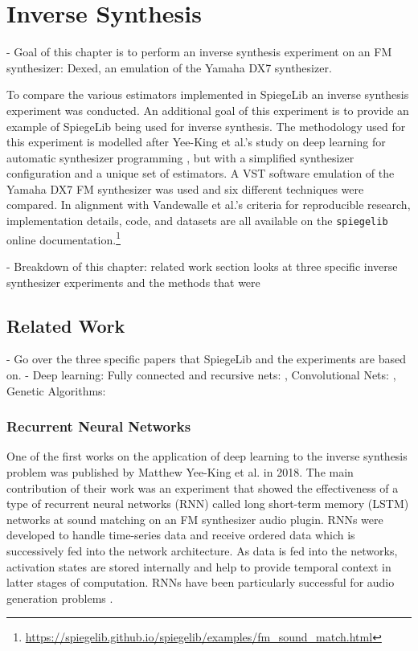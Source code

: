 \chapter{Inverse Synthesis}
\label{chapter:inverse_synth_experiment}

- Goal of this chapter is to perform an inverse synthesis experiment on an FM synthesizer: Dexed, an emulation of the Yamaha DX7 synthesizer. 

To compare the various estimators implemented in SpiegeLib an inverse synthesis experiment was conducted. An additional goal of this experiment is to provide an example of SpiegeLib being used for inverse synthesis. The methodology used for this experiment is modelled after Yee-King et al.'s study on deep learning for automatic synthesizer programming \cite{yee2018automatic}, but with a simplified synthesizer configuration and a unique set of estimators. A VST software emulation of the Yamaha DX7 FM synthesizer was used and six different techniques were compared. In alignment with Vandewalle et al.'s criteria for reproducible research, implementation details, code, and datasets are all available on the \texttt{spiegelib} online documentation.\footnote{\url{https://spiegelib.github.io/spiegelib/examples/fm_sound_match.html}}

- Breakdown of this chapter: related work section looks at three specific inverse synthesizer experiments and the methods that were 

\section{Related Work}
- Go over the three specific papers that SpiegeLib and the experiments are based on.
- Deep learning: Fully connected and recursive nets: \cite{yee2018automatic}, Convolutional Nets: \cite{barkan2019inversynth}, Genetic Algorithms: \cite{tatar2016automatic}

\subsection{Recurrent Neural Networks}
One of the first works on the application of deep learning to the inverse synthesis problem was published by Matthew Yee-King et al. \cite{yee2018automatic} in 2018. The main contribution of their work was an experiment that showed the effectiveness of a type of recurrent neural networks (RNN) called long short-term memory (LSTM) networks at sound matching on an FM synthesizer audio plugin. RNNs were developed to handle time-series data and receive ordered data which is successively fed into the network architecture. As data is fed into the networks, activation states are stored internally and help to provide temporal context in latter stages of computation. RNNs have been particularly successful for audio generation problems \cite{oord2016wavenet, engel2017neural}. 

